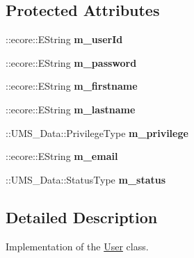 \subsection*{Protected Attributes}
\begin{DoxyCompactItemize}
\item 
\hypertarget{classUMS__Data_1_1User_ad6e7abd225fcb745f654faa2d50c62cd}{
::ecore::EString {\bfseries m\_\-userId}}
\label{classUMS__Data_1_1User_ad6e7abd225fcb745f654faa2d50c62cd}

\item 
\hypertarget{classUMS__Data_1_1User_a41ff3b27b1abb723356f2d736c709472}{
::ecore::EString {\bfseries m\_\-password}}
\label{classUMS__Data_1_1User_a41ff3b27b1abb723356f2d736c709472}

\item 
\hypertarget{classUMS__Data_1_1User_a45257f10c7481122d07a1a56a093b3b8}{
::ecore::EString {\bfseries m\_\-firstname}}
\label{classUMS__Data_1_1User_a45257f10c7481122d07a1a56a093b3b8}

\item 
\hypertarget{classUMS__Data_1_1User_ab29a52294b44cbbf50558a4108fd234e}{
::ecore::EString {\bfseries m\_\-lastname}}
\label{classUMS__Data_1_1User_ab29a52294b44cbbf50558a4108fd234e}

\item 
\hypertarget{classUMS__Data_1_1User_ac035fd4799e7304069fbc2f7cde6643c}{
::UMS\_\-Data::PrivilegeType {\bfseries m\_\-privilege}}
\label{classUMS__Data_1_1User_ac035fd4799e7304069fbc2f7cde6643c}

\item 
\hypertarget{classUMS__Data_1_1User_a5d7dca5746f5144cea80e6df15cd480c}{
::ecore::EString {\bfseries m\_\-email}}
\label{classUMS__Data_1_1User_a5d7dca5746f5144cea80e6df15cd480c}

\item 
\hypertarget{classUMS__Data_1_1User_a30d28d1333bbb4cc1b5362192dcf2af1}{
::UMS\_\-Data::StatusType {\bfseries m\_\-status}}
\label{classUMS__Data_1_1User_a30d28d1333bbb4cc1b5362192dcf2af1}

\end{DoxyCompactItemize}


\subsection{Detailed Description}
Implementation of the \hyperlink{classUMS__Data_1_1User}{User} class. 

